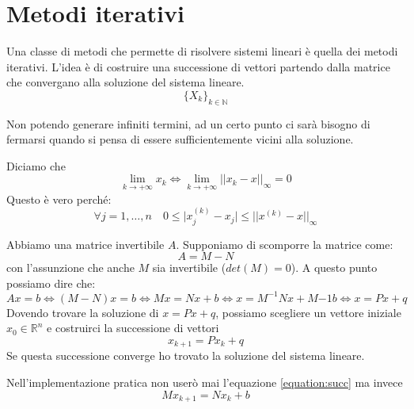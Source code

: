 \newpage
\section{Metodi iterativi}
Una classe di metodi che permette di risolvere sistemi lineari è quella dei metodi iterativi. L'idea è di costruire una successione di vettori partendo dalla matrice che convergano alla soluzione del sistema lineare.
\begin{equation*}
	\{X_k\}_{k\in \mathbb{N}}
\end{equation*}
\begin{observation}
	Non potendo generare infiniti termini, ad un certo punto ci sarà bisogno di fermarsi quando si pensa di essere sufficientemente vicini alla soluzione.
\end{observation}
Diciamo che
\begin{equation}
	\lim_{k\to +\infty}x_k \Leftrightarrow \lim_{k\to +\infty} \lvert\lvert x_k - x\rvert\rvert_{\infty} = 0
\end{equation}
\noindent Questo è vero perché:
\begin{equation*}
	\forall j = 1, \ldots, n \quad 0 \leq \lvert x^{(k)}_j - x_j \rvert \leq \lvert\lvert x^{(k)} - x\rvert\rvert_{\infty}
\end{equation*}

Abbiamo una matrice invertibile $A$. Supponiamo di scomporre la matrice come:
\begin{equation}
	A=M-N
\end{equation}
con l'assunzione che anche $M$ sia invertibile ($det(M)=0$). A questo punto possiamo dire che:
\begin{equation*}
	Ax=b \Leftrightarrow (M-N)x = b\Leftrightarrow Mx=Nx+b \Leftrightarrow x=M^{-1}Nx + M{-1}b \Leftrightarrow x=Px+q
\end{equation*}
Dovendo trovare la soluzione di $x=Px+q$, possiamo scegliere un vettore iniziale $x_0 \in \mathbb{R}^n$ e costruirci la successione di vettori
\begin{equation}
	\label{equation:succ}
	x_{k+1}=Px_k + q
\end{equation}
Se questa successione converge ho trovato la soluzione del sistema lineare.
\begin{observation}
	Nell'implementazione pratica non userò mai l'equazione \ref{equation:succ} ma invece
	\begin{equation}
		Mx_{k+1}=Nx_k + b
	\end{equation}
\end{observation}

